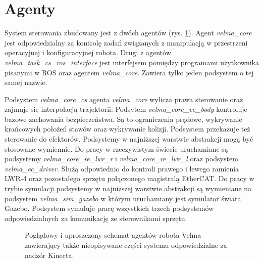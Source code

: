 	\section{Agenty}
	System sterowania \cite{bib:velma2} zbudowany jest z dwóch agentów (rys. \ref{fig:agent}). Agent \textit{velma\_core} jest odpowiedzialny za kontrolę zadań związanych z manipulacją w przestrzeni operacyjnej i konfiguracyjnej robota. Drugi z agentów \textit{velma\_task\_cs\_ros\_interface} jest interfejsem pomiędzy programami użytkownika pisanymi w ROS oraz agentem \textit{velma\_core}. Zawiera tylko jeden podsystem o tej samej nazwie.

	Podsystem \textit{velma\_core\_cs} agenta \textit{velma\_core} wylicza prawa sterowanie oraz zajmuje się interpolacją trajektorii. Podsytem \textit{velma\_core\_ve\_body} kontroluje bazowe zachowania bezpieczeństwa. Są to ograniczenia prądowe, wykrywanie krańcowych położeń stawów oraz wykrywanie kolizji. Podsystem przekazuje też sterowanie do efektorów. Podsystemy w najniższej warstwie abstrakcji mogą być stosowane wymiennie. Do pracy w rzeczywistym świecie uruchamiane są podsystemy \textit{velma\_core\_re\_lwr\_r} i \textit{velma\_core\_re\_lwr\_l} oraz podsystem \textit{velma\_ec\_driver}. Służą odpowiednio do kontroli prawego i lewego ramienia LWR-4 oraz pozostałego sprzętu połączonego magistralą EtherCAT. Do pracy w trybie symulacji podsystemy w najniższej warstwie abstrakcji są wymieniane na podsystem \textit{velma\_sim\_gazebo} w którym uruchamiany jest symulator świata Gazebo. Podsystem symuluje pracę wszystkich trzech podsystemów odpowiedzialnych za komunikację ze sterownikami sprzętu. 
	
		\begin{figure}
		\centering
		\hfill
		
		\caption{Poglądowy i uproszczony schemat agentów robota Velma zawierający także nieopisywane części systemu odpowiedzialne za nadzór Kinecta\cite{bib:velma2}.}
		\label{fig:agent}
		
	\end{figure}


